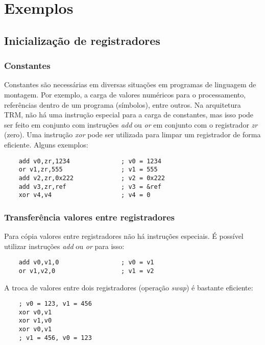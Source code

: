 \documentclass[11pt,a4paper]{report}
\begin{document}
\section{Exemplos}

\subsection{Inicialização de registradores}

\subsubsection{Constantes}

Constantes são necessárias em diversas situações em programas de
linguagem de montagem. Por exemplo, a carga de valores numéricos para
o processamento, referências dentro de um programa (símbolos), entre
outros. Na arquitetura TRM, não há uma instrução especial para a carga
de constantes, mas isso pode ser feito em conjunto com instruções
\textit{add} ou \textit{or} em conjunto com o registrador \textit{zr}
(zero). Uma instrução \textit{xor} pode ser utilizada para limpar um
registrador de forma eficiente. Alguns exemplos:

\begin{verbatim}
    add v0,zr,1234              ; v0 = 1234
    or v1,zr,555                ; v1 = 555
    add v2,zr,0x222             ; v2 = 0x222
    add v3,zr,ref               ; v3 = &ref 
    xor v4,v4                   ; v4 = 0
\end{verbatim}

\subsubsection{Transferência valores entre registradores}

Para cópia valores entre registradores não há instruções especiais. É
possível utilizar instruções \textit{add} ou \textit{or} para isso:

\begin{verbatim}
    add v0,v1,0                 ; v0 = v1
    or v1,v2,0                  ; v1 = v2
\end{verbatim}

A troca de valores entre dois registradores (operação \textit{swap}) é
bastante eficiente:

\begin{verbatim}
    ; v0 = 123, v1 = 456
    xor v0,v1
    xor v1,v0
    xor v0,v1
    ; v1 = 456, v0 = 123
\end{verbatim}
\end{document}
